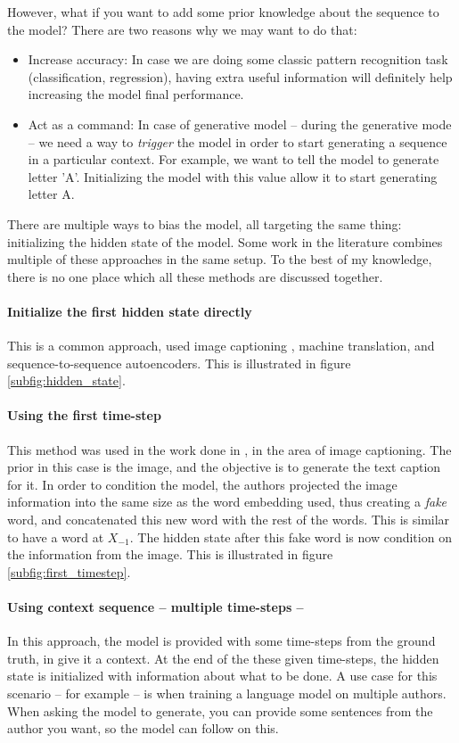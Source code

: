 \par However, what if you want to add some prior knowledge about the sequence to the model? There are two reasons why we may want to do that:
\begin{itemize}
    \item Increase accuracy: In case we are doing some classic pattern recognition task (classification, regression), having extra useful information will definitely help increasing the model final performance.
    \item Act as a command: In case of generative model -- during the generative mode -- we need a way to \textit{trigger} the model in order to start generating a sequence in a particular context. For example, we want to tell the model to generate letter 'A'.  Initializing the model with this value allow it to start generating letter A.
\end{itemize}

There are multiple ways to bias the model, all targeting the same thing: initializing the hidden state of the model. Some work in the literature combines multiple of these approaches in the same setup. To the best of my knowledge, there is no one place which all these methods are discussed together.

\paragraph{Initialize the first hidden state directly} This is a common approach, used image captioning \citep{karpathy2015deep}, machine translation, and sequence-to-sequence autoencoders. This is illustrated in figure \ref{subfig:hidden_state}.

\paragraph{Using the first time-step} This method was used in the work done in \citep{vinyals2015show}, in the area of image captioning. The prior in this case is the image, and the objective is to generate the text caption for it. In order to condition the model, the authors projected the image information into the same size as the word embedding used, thus creating a \textit{fake} word, and concatenated this new word with the rest of the words. This is similar to have a word at $X_{-1}$. The hidden state after this fake word is now condition on the information from the image. This is illustrated in figure \ref{subfig:first_timestep}.

\paragraph{Using context sequence -- multiple time-steps --} In this approach, the model is provided with some time-steps from the ground truth, in give it a context. At the end of the these given time-steps, the hidden state is initialized with information about what to be done. A use case for this scenario -- for example -- is when training a language model on multiple authors. When asking the model to generate, you can provide some sentences from the author you want, so the model can follow on this.

